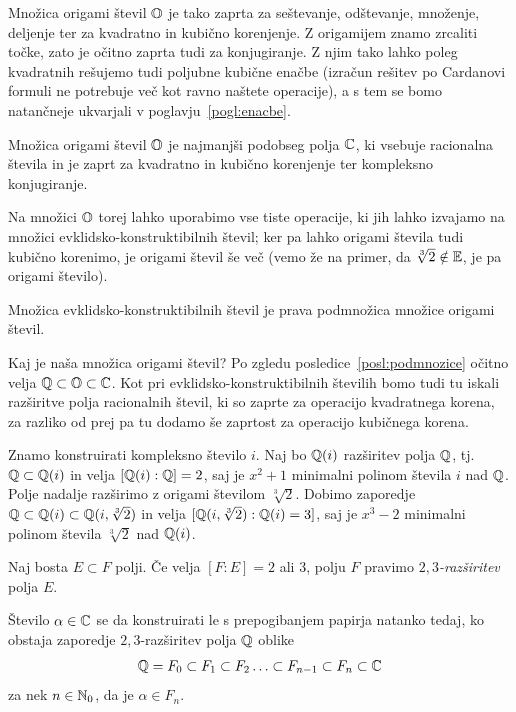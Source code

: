 Množica origami števil $\mathbb O$ je tako zaprta za seštevanje, odštevanje, množenje, deljenje ter za kvadratno in kubično korenjenje. Z origamijem znamo zrcaliti točke, zato je očitno zaprta tudi za konjugiranje. Z njim tako lahko poleg kvadratnih rešujemo tudi poljubne kubične enačbe (izračun rešitev po Cardanovi formuli ne potrebuje več kot ravno naštete operacije), a s tem se bomo natančneje ukvarjali v poglavju~\ref{pogl:enacbe}.

\begin{posledica}
    Množica origami števil $\mathbb O$ je najmanjši podobseg polja $\mathbb C$, ki vsebuje racionalna števila in je zaprt za kvadratno in kubično korenjenje ter kompleksno konjugiranje.
\end{posledica}

Na množici $\mathbb O$ torej lahko uporabimo vse tiste operacije, ki jih lahko izvajamo na množici evklidsko-konstruktibilnih števil; ker pa lahko origami števila tudi kubično korenimo, je origami števil še več (vemo že na primer, da $\sqrt[3]{2} \notin \mathbb E$, je pa origami število).

\begin{posledica}
    Množica evklidsko-konstruktibilnih števil je prava podmnožica množice origami števil.
\end{posledica}

Kaj je naša množica origami števil? Po zgledu posledice~\ref{posl:podmnozice} očitno velja $\mathbb Q \subset \mathbb O \subset \mathbb C$. Kot pri evklidsko-konstruktibilnih številih bomo tudi tu iskali razširitve polja racionalnih števil, ki so zaprte za operacijo kvadratnega korena, za razliko od prej pa tu dodamo še zaprtost za operacijo kubičnega korena.

Znamo konstruirati kompleksno število $i$. Naj bo $\mathbb Q(i)$ razširitev polja $\mathbb Q$, tj.\ $\mathbb Q \subset \mathbb Q(i)$ in velja $[\mathbb Q(i) : \mathbb Q] = 2$, saj je $x^2 + 1$ minimalni polinom števila $i$ nad $\mathbb Q$. Polje nadalje razširimo z origami številom $\sqrt[3]{2}$. Dobimo zaporedje $\mathbb Q \subset \mathbb Q(i) \subset \mathbb Q(i, \sqrt[3]{2})$ in velja $[\mathbb Q(i, \sqrt[3]{2}) : \mathbb Q(i) = 3]$, saj je $x^3 - 2$ minimalni polinom števila $\sqrt[3]{2}$ nad $\mathbb Q(i)$.

\begin{definicija}
    Naj bosta $E \subset F$ polji. Če velja $[F:E] = 2$ ali $3$, polju $F$ pravimo \emph{$2,3$-razširitev} polja $E$.
\end{definicija}

\begin{izrek}
    \label{izr:orig_konstr}
    Število $\alpha \in \mathbb C$ se da konstruirati le s prepogibanjem papirja natanko tedaj, ko obstaja zaporedje $2,3$-razširitev polja $\mathbb Q$ oblike
    $$ \mathbb Q = F_0 \subset F_1 \subset F_2 \ldots \subset F_{n-1} \subset F_n \subset \mathbb C $$
    za nek $n \in \mathbb N_0$, da je $\alpha \in F_n$.
\end{izrek}

